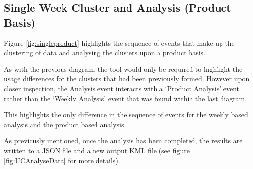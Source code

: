 \newpage
\subsection{Single Week Cluster and Analysis (Product Basis)}
Figure \ref{fig:singleproduct} highlights the sequence of events that make up 
the clustering of data and analysing the clusters upon a product basis.

As with the previous diagram, the tool would only be required to highlight the 
usage differences for the clusters that had been previously formed. However upon 
closer inspection, the Analysis event interacts with a `Product Analysis' event 
rather than the `Weekly Analysis' event that was found within the last diagram.

This highlights the only difference in the sequence of events for the weekly 
based analysis and the product based analysis.

As previously mentioned, once the analysis has been completed, the results are 
written to a JSON file and a new output KML file (see figure 
\ref{fig:UCAnalyseData} for more details).



